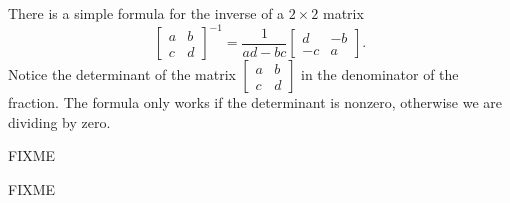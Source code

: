 There is a simple formula for the inverse of a $2 \times 2$ matrix
\begin{equation*}
\begin{bmatrix}
a & b \\
c & d
\end{bmatrix}^{-1}
=
\frac{1}{ad-bc}
\begin{bmatrix}
d & -b \\
-c & a
\end{bmatrix} .
\end{equation*}
Notice the determinant of the matrix
$[\begin{smallmatrix}a&b\\c&d\end{smallmatrix}]$
in the denominator of the fraction.
The formula only works if the determinant is nonzero, otherwise we are
dividing by zero.

FIXME


FIXME

